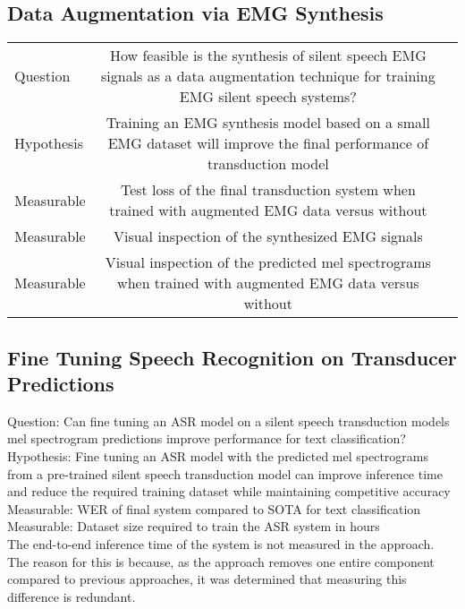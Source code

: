 \subsection{Data Augmentation via EMG Synthesis}

{\begin{center}
    \begin{tabular} {  l  c  c  }
    \hline
    Question & How feasible is the synthesis of silent speech EMG signals
    as a data augmentation technique for training EMG silent speech systems?\\
    Hypothesis & Training an EMG synthesis model based on a small
    EMG dataset will improve the final performance of transduction model\\
    Measurable & Test loss of the final transduction system when trained
    with augmented EMG data versus without \\
    Measurable & Visual inspection of the synthesized EMG signals \\
    Measurable & Visual inspection of the predicted mel spectrograms when
    trained with augmented EMG data versus without
    \end{tabular}
\end{center}}

\subsection{Fine Tuning Speech Recognition on Transducer Predictions }


Question: Can fine tuning an ASR model on a silent speech
transduction models mel spectrogram predictions improve performance for
text classification? \\

Hypothesis: Fine tuning an ASR model with the predicted
mel spectrograms from a pre-trained silent speech transduction model
can improve inference time and reduce the required training dataset
while maintaining competitive accuracy \\

Measurable: WER of final system compared to SOTA for text classification \\
Measurable: Dataset size required to train the ASR system in hours \\

The end-to-end inference time of the system is not measured in the
approach. The reason for this is because, as the approach removes one
entire component compared to previous approaches, it was determined that
measuring this difference is redundant.